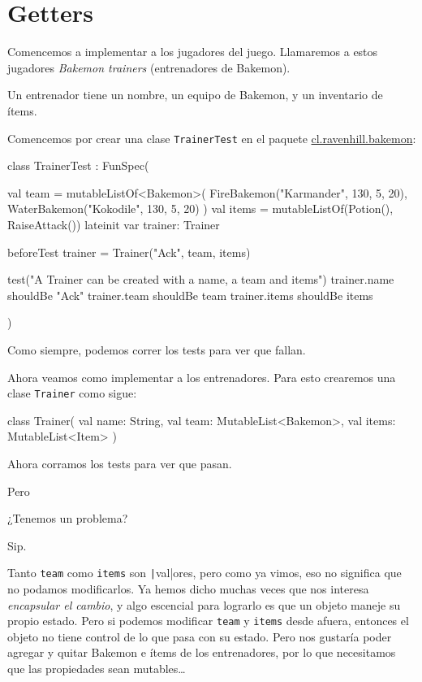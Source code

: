 \section{Getters}
  Comencemos a implementar a los jugadores del juego.
  Llamaremos a estos jugadores \textit{Bakemon trainers} (entrenadores de Bakemon).

  Un entrenador tiene un nombre, un equipo de Bakemon, y un inventario de ítems.

  Comencemos por crear una clase \texttt{TrainerTest} en el paquete \url{cl.ravenhill.bakemon}:

  \begin{kotlin}
    class TrainerTest : FunSpec({
      val team = mutableListOf<Bakemon>(
        FireBakemon("Karmander", 130, 5, 20),
        WaterBakemon("Kokodile", 130, 5, 20)
      )
      val items = mutableListOf(Potion(), RaiseAttack())
      lateinit var trainer: Trainer
      
      beforeTest {
        trainer = Trainer("Ack", team, items)
      }
      
      test("A Trainer can be created with a name, a team and items") {
        trainer.name shouldBe "Ack"
        trainer.team shouldBe team
        trainer.items shouldBe items
      }
    })
  \end{kotlin}

  Como siempre, podemos correr los tests para ver que fallan.

  Ahora veamos como implementar a los entrenadores.
  Para esto crearemos una clase \texttt{Trainer} como sigue:

  \begin{kotlin}
    class Trainer(
      val name: String,
      val team: MutableList<Bakemon>,
      val items: MutableList<Item>
    )
  \end{kotlin}

  Ahora corramos los tests para ver que pasan.

  Pero

  \begin{center}
    ¿Tenemos un problema?
  \end{center}

  Sip.

  Tanto \texttt{team} como \texttt{items} son \texttt|val|ores, pero como ya vimos, eso
  no significa que no podamos modificarlos.
  Ya hemos dicho muchas veces que nos interesa \textit{encapsular el cambio}, y algo escencial para
  lograrlo es que un objeto maneje su propio estado.
  Pero si podemos modificar \texttt{team} y \texttt{items} desde afuera, entonces el objeto no
  tiene control de lo que pasa con su estado.
  Pero nos gustaría poder agregar y quitar Bakemon e ítems de los entrenadores, por lo que 
  necesitamos que las propiedades sean mutables\dots

